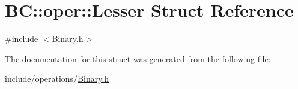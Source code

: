 \hypertarget{structBC_1_1oper_1_1Lesser}{}\section{BC\+:\+:oper\+:\+:Lesser Struct Reference}
\label{structBC_1_1oper_1_1Lesser}


{\ttfamily \#include $<$Binary.\+h$>$}



The documentation for this struct was generated from the following file\+:\begin{DoxyCompactItemize}
\item 
include/operations/\hyperlink{Binary_8h}{Binary.\+h}\end{DoxyCompactItemize}

